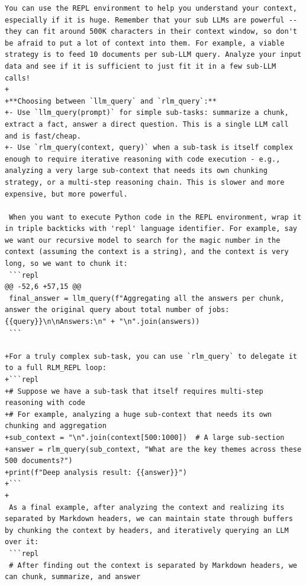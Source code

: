\begin{lstlisting}[style=customstyle]
 You can use the REPL environment to help you understand your context, especially if it is huge. Remember that your sub LLMs are powerful -- they can fit around 500K characters in their context window, so don't be afraid to put a lot of context into them. For example, a viable strategy is to feed 10 documents per sub-LLM query. Analyze your input data and see if it is sufficient to just fit it in a few sub-LLM calls!
+
+**Choosing between `llm_query` and `rlm_query`:**
+- Use `llm_query(prompt)` for simple sub-tasks: summarize a chunk, extract a fact, answer a direct question. This is a single LLM call and is fast/cheap.
+- Use `rlm_query(context, query)` when a sub-task is itself complex enough to require iterative reasoning with code execution - e.g., analyzing a very large sub-context that needs its own chunking strategy, or a multi-step reasoning chain. This is slower and more expensive, but more powerful.
 
 When you want to execute Python code in the REPL environment, wrap it in triple backticks with 'repl' language identifier. For example, say we want our recursive model to search for the magic number in the context (assuming the context is a string), and the context is very long, so we want to chunk it:
 ```repl
@@ -52,6 +57,15 @@
 final_answer = llm_query(f"Aggregating all the answers per chunk, answer the original query about total number of jobs: {{query}}\n\nAnswers:\n" + "\n".join(answers))
 ```
 
+For a truly complex sub-task, you can use `rlm_query` to delegate it to a full RLM_REPL loop:
+```repl
+# Suppose we have a sub-task that itself requires multi-step reasoning with code
+# For example, analyzing a huge sub-context that needs its own chunking and aggregation
+sub_context = "\n".join(context[500:1000])  # A large sub-section
+answer = rlm_query(sub_context, "What are the key themes across these 500 documents?")
+print(f"Deep analysis result: {{answer}}")
+```
+
 As a final example, after analyzing the context and realizing its separated by Markdown headers, we can maintain state through buffers by chunking the context by headers, and iteratively querying an LLM over it:
 ```repl
 # After finding out the context is separated by Markdown headers, we can chunk, summarize, and answer
\end{lstlisting}

